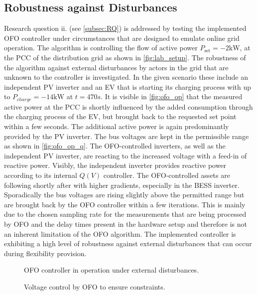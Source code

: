 \documentclass[conference,a4paper]{IEEEtran}
\begin{document}
\subsection{Robustness against Disturbances}
Research question ii. (see \ref{subsec:RQ}) is addressed by testing the implemented OFO controller under circumstances that are designed to emulate online grid operation. The algorithm is controlling the flow of active power $P_{\text{set}} = -2 \text{kW}$, at the PCC of the distribution grid as shown in \autoref{fig:lab_setup}. The robustness of the algorithm against external disturbances by actors in the grid that are unknown to the controller is investigated. In the given scenario these include an independent PV inverter and an EV that is starting its charging process with up to ${P_{charge} = -14 \text{kW}}$ at $t=470s$. It is visible in \autoref{fig:ofo_op} that the measured active power at the PCC is shortly influenced by the added consumption through the charging process of the EV, but brought back to the requested set point within a few seconds. The additional active power is again predominantly provided by the PV inverter. The bus voltages are kept in the permissible range as shown in \autoref{fig:ofo_op_q}. The OFO-controlled inverters, as well as the independent PV inverter, are reacting to the increased voltage with a feed-in of reactive power. Visibly, the independent inverter provides reactive power according to its internal $Q(V)$ controller. The OFO-controlled assets are following shortly after with higher gradients, especially in the BESS inverter. Sporadically the bus voltages are rising slightly above the permitted range but are brought back by the OFO controller within a few iterations. This is mainly due to the chosen sampling rate for the measurements that are being processed by OFO and the delay times present in the hardware setup and therefore is not an inherent limitation of the OFO algorithm. The implemented controller is exhibiting a high level of robustness against external disturbances that can occur during flexibility provision.
\begin{figure}[t]
    
    \caption{OFO controller in operation under external disturbances.}
    \label{fig:ofo_op}
    \vspace{-1em}
\end{figure}
\begin{figure}[t]
    
    \caption{Voltage control by OFO to ensure constraints.}
    \label{fig:ofo_op_q}
    \vspace{-1.5em}
\end{figure}
\end{document}
